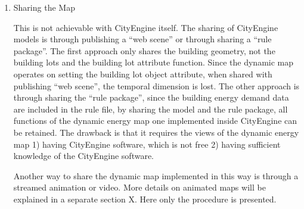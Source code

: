 \begin{enumerate}[1)]
  \begin{figure}[h!]
    \centering
    \texttt{[image: timeSliderCampus.png]}
    \caption[Slider in Campus Example]{Slider in Campus Example}
    \label{fig:timeSliderCampus}
  \end{figure}
  \begin{figure}[h!]
    \centering
    \texttt{[image: campusColor.png]}
    \caption[Finished Campus Example]{Finished Campus Example}
    \label{fig:campusColor}
  \end{figure}

  \begin{figure}[h!]
    \centering
    \begin{subfigure}{0.7\textwidth}
      \centering
      \texttt{[image: sliderImag.png]}
      \caption[Conceptual Community Setting Slider Winter]{Conceptual
        Community Setting Slider Winter}
      \label{fig:sliderImag}
    \end{subfigure}
    ~
    \begin{subfigure}{0.7\textwidth}
      \centering
      \texttt{[image: sliderImag2.png]}
      \caption[Conceptual Community Setting Slider Summer]{Conceptual
        Community Setting Slider Summer}
      \label{fig:sliderImag2}
    \end{subfigure}
  \end{figure}

\item{Sharing the Map}

  This is not achievable with CityEngine itself. The sharing of
  CityEngine models is through publishing a ``web scene'' or through
  sharing a ``rule package''. The first approach only shares the
  building geometry, not the building lots and the building lot
  attribute function. Since the dynamic map operates on setting the
  building lot object attribute, when shared with publishing ``web
  scene'', the temporal dimension is lost. The other approach is
  through sharing the ``rule package'', since the building energy
  demand data are included in the rule file, by sharing the model and
  the rule package, all functions of the dynamic energy map one
  implemented inside CityEngine can be retained. The drawback is that
  it requires the views of the dynamic energy map 1) having CityEngine
  software, which is not free 2) having sufficient knowledge of the
  CityEngine software.

  Another way to share the dynamic map implemented in this way is
  through a streamed animation or video. More details on animated maps
  will be explained in a separate section X. Here only the procedure
  is presented.
\end{enumerate}